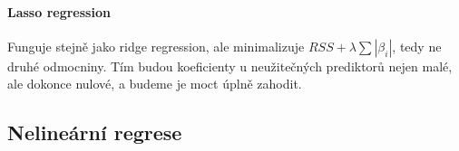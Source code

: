 \documentclass[10pt,a4paper]{article}
\begin{document}
\paragraph{Lasso regression} Funguje stejně jako ridge regression, ale minimalizuje $RSS + \lambda\sum|\beta_i|$, tedy ne druhé odmocniny. Tím budou koeficienty u neužitečných prediktorů nejen malé, ale dokonce nulové, a budeme je moct úplně zahodit.

\subsection{Nelineární regrese}
\end{document}
